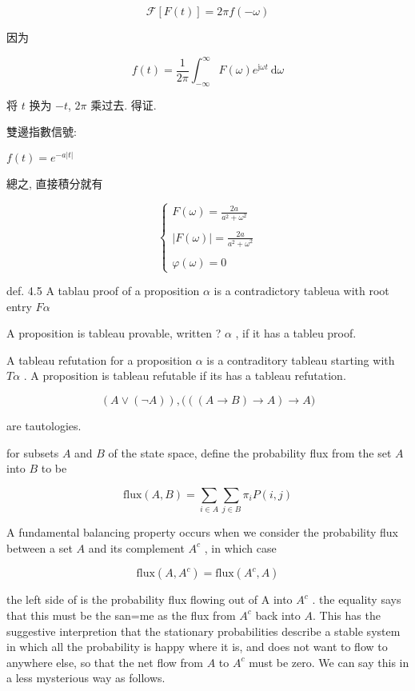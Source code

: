 \documentclass[a4paper, 10pt]{ctexbook} %
\begin{document}
$$ \mathscr F \left[ F\left(t\right)  \right] = 2\pi f\left( - \omega\right)$$ 

因为 

$$f\left(t\right) = \frac{1}{2\pi} \int ^{\infty} _{-\infty} F\left(\omega\right) e ^{\mathrm{j} \omega t} \ \mathrm{d} \omega $$

将 $t$ 换为 $-t$, $2\pi$ 乘过去. 得证.

雙邊指數信號:

$f\left(t\right)  = e ^{ - a \left|  t \right|  } $

總之, 直接積分就有


$$ \begin{cases} \displaystyle  F\left(\omega\right)  = \frac{2a}{ a^{2} + \omega ^{2}} \\ \\ \displaystyle    \left|  F \left(\omega\right)  \right|  = \frac{ 2a }{a^{2} + \omega ^{2} } \\  \\ \varphi (\omega    ) = 0 \end{cases} $$

def. 4.5 A tablau proof of a proposition $\alpha$ is a contradictory tableua with root entry $F\alpha$

A proposition is tableau provable, written ? $\alpha$ , if it has a tableu proof. 

A tableau refutation for a proposition $\alpha$ is a contraditory tableau starting with $T\alpha$ . A proposition is tableau refutable if its has a tableau refutation.


$$ \left( A \vee  \left(\neg A\right)\right), \big( \left(\left(A \to B \right) \to A \right) \to A\big)$$

are tautologies. 


for subsets $A$ and $B$ of the state space, define the probability flux from the set $A$ into $B$ to be 

$$\text{flux} \left(A , B\right) = \sum_{i \in A}  \sum_{ j\in B}  \pi_{i} P\left(i,  j\right) $$

A fundamental balancing property occurs when we consider the probability flux between a set $A$ and its complement $A ^{c}$ , in which case 

$$ \text{flux} \left(A , A^{c}\right) = \text{flux} \left(A^{c} , A\right)$$

the left side of is the probability flux flowing out of A into $A ^{c} $ . the equality says that this must be the san=me as the flux from $A^{c}$ back into $A$. This has the suggestive interpretion that  the stationary probabilities describe a stable system in which all the probability is happy where it is, and does not want to flow to anywhere else, so that the net flow from $A$ to $A^{c}$ must be zero. We can say this in a less mysterious way as follows.
\end{document}
